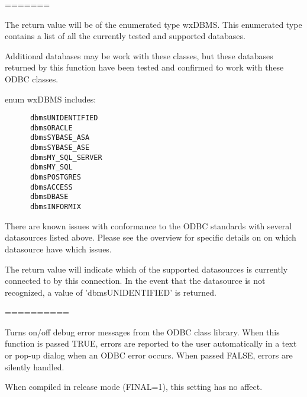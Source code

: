 

=======
\label{wxdbdbms}



The return value will be of the enumerated type wxDBMS.  This enumerated
type contains a list of all the currently tested and supported databases.

Additional databases may be work with these classes, but these databases
returned by this function have been tested and confirmed to work with 
these ODBC classes.

enum wxDBMS includes:
\begin{verbatim}
      dbmsUNIDENTIFIED
      dbmsORACLE
      dbmsSYBASE_ASA
      dbmsSYBASE_ASE
      dbmsMY_SQL_SERVER
      dbmsMY_SQL
      dbmsPOSTGRES
      dbmsACCESS
      dbmsDBASE
      dbmsINFORMIX	
\end{verbatim}

There are known issues with conformance to the ODBC standards with several
datasources listed above.  Please see the overview for specific details on
on which datasource have which issues.


The return value will indicate which of the supported datasources is 
currently connected to by this connection.  In the event that the
datasource is not recognized, a value of 'dbmsUNIDENTIFIED' is returned.

==========
\label{wxdbsetdebugerrormessages}




Turns on/off debug error messages from the ODBC class library.  When
this function is passed TRUE, errors are reported to the user automatically
in a text or pop-up dialog when an ODBC error occurs.  When passed FALSE,
errors are silently handled.

When compiled in release mode (FINAL=1), this setting has no affect.





